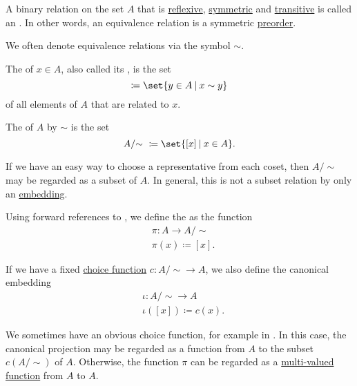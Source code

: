 \begin{definition}\label{def:equivalence_relation}
  A binary relation on the set \( A \) that is \hyperref[def:binary_relation/reflexive]{reflexive}, \hyperref[def:binary_relation/symmetric]{symmetric} and \hyperref[def:binary_relation/transitive]{transitive} is called an . In other words, an equivalence relation is a symmetric \hyperref[def:preordered_set]{preorder}.

  We often denote equivalence relations via the symbol \( \sim \).

  \begin{thmenum}
     The  of \( x \in A \), also called its , is the set
    \begin{equation*}
      [x] \coloneqq \set{ y \in A \given x \sim y }
    \end{equation*}
    of all elements of \( A \) that are related to \( x \).

     The  of \( A \) by \( \sim \) is the set
    \begin{equation*}
      A / {\sim} \ \coloneqq \set{ [x] \given x \in A }.
    \end{equation*}

     If we have an easy way to choose a representative from each coset, then \( A / {\sim} \) may be regarded as a subset of \( A \). In general, this is not a subset relation by only an \hyperref[def:first_order_homomorphism_invertibility/embedding]{embedding}.

     Using forward references to , we define the  as the function
    \begin{equation*}
      \begin{aligned}
        &\pi: A \to A / {\sim}  \\
        &\pi(x) \coloneqq [x].
      \end{aligned}
    \end{equation*}

    If we have a fixed \hyperref[def:choice_function]{choice function} \( c: A / {\sim} \to A \), we also define the canonical embedding
    \begin{equation*}
      \begin{aligned}
        &\iota: A / {\sim} \to A \\
        &\iota([x]) \coloneqq c(x).
      \end{aligned}
    \end{equation*}

    We sometimes have an obvious choice function, for example in . In this case, the canonical projection may be regarded as a function from \( A \) to the subset \( c(A / {\sim}) \) of \( A \). Otherwise, the function \( \pi \) can be regarded as a \hyperref[def:multi_valued_function]{multi-valued function} from \( A \) to \( A \).
  \end{thmenum}
\end{definition}

